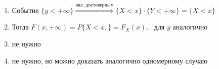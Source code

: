 \begin{enumerate}[topsep=0pt, leftmargin=20pt, noitemsep, label=\arabic*\degree]
	\item Событие $\{y<+\infty\}\stackrel{\text{явл. достоверным}}{\Rightarrow}\{X<x\}\cdot\{Y<+\infty\}=\{X<x\}$
	\item [ ] Тогда $F(x, +\infty)= P\{X<x,\}=F_{X}(x)$. ~для $y$ аналогично
	
	\item не нужно
	
	\item не нужно, но можно доказать аналогично одномерному случаю	
\end{enumerate}


\clearpage
